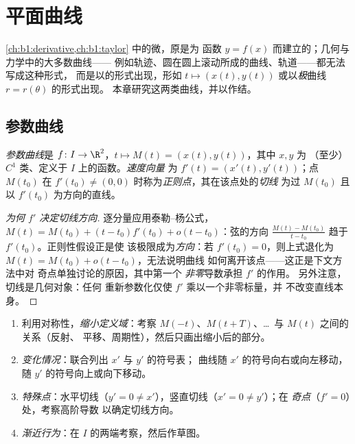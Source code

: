 \chapter{平面曲线}\label{ch:b1:curves}

 \cref{ch:b1:derivative,ch:b1:taylor} 中的微，原是为
函数 $y = f(x)$ 而建立的；几何与力学中的大多数曲线——
例如轨迹、圆在圆上滚动所成的曲线、轨道——都无法写成这种形式，
而是以\emph{}的形式出现，形如 $t \mapsto (x(t),
y(t))$ 或以\emph{极}曲线 $r = r(\theta)$ 的形式出现。
本章研究这两类曲线，并以作结。

\section{参数曲线}

\begin{definition}\label{def:b1:curves:def}
\emph{参数曲线}是 $f
\colon I \to \R^2$，$t \mapsto M(t) = (x(t), y(t))$，其中 $x, y$ 为
（至少）$C^1$ 类、定义于 $I$ 上的函数。\emph{速度向量}
为 $f'(t) = (x'(t), y'(t))$；点 $M(t_0)$ 在
$f'(t_0) \neq (0,0)$ 时称为\emph{正则点}，其在该点处的\emph{切线}
为过 $M(t_0)$ 且以 $f'(t_0)$ 为方向的直线。
\end{definition}

\begin{proof}[为何 $f'$ 决定切线方向]
逐分量应用泰勒–杨公式，$M(t) = M(t_0) + (t - t_0) f'(t_0) +
o(t - t_0)$：弦的方向 $\frac{M(t) - M(t_0)}{t - t_0}$
趋于 $f'(t_0)$。正则性假设正是使
该极限成为\emph{方向}：若 $f'(t_0) = 0$，则上式退化为
$M(t) = M(t_0) + o(t - t_0)$，无法说明曲线
如何离开该点——这正是下文方法中对
奇点单独讨论的原因，其中第一个
\emph{非零}导数承担 $f'$ 的作用。
另外注意，切线是几何对象：任何
重新参数化仅使 $f'$ 乘以一个非零标量，并
不改变直线本身。
\end{proof}

\begin{method}[参数曲线的研究]\label{met:b1:curves:study}
\begin{enumerate}
  \item 利用对称性，\emph{缩小定义域}：考察
        $M(-t)$、$M(t + T)$、\dots\ 与 $M(t)$ 之间的关系（反射、
        平移、周期性），然后只画出缩小后的部分。
  \item \emph{变化情况}：联合列出 $x'$ 与 $y'$ 的符号表；
        曲线随 $x'$ 的符号向右或向左移动，随 $y'$ 的符号向上或向下移动。
  \item \emph{特殊点}：水平切线（$y' = 0 \neq
        x'$），竖直切线（$x' = 0 \neq y'$）；在
        \emph{奇点}（$f' = 0$）处，考察高阶导数
        以确定切线方向。
  \item \emph{渐近行为}：在 $I$ 的两端考察，然后作草图。
\end{enumerate}
\end{method}

